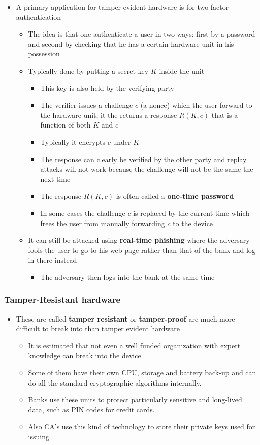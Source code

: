 \documentclass[11pt]{article}
\begin{document}
\begin{itemize}
\item A primary application for tamper-evident hardware is for two-factor authentication
\begin{itemize}
\item The idea is that one authenticate a user in two ways: first by a password and second by checking that he has a certain hardware unit in his possession
\item Typically done by putting a secret key \(K\) inside the unit
\begin{itemize}
\item This key is also held by the verifying party
\item The verifier issues a challenge \(c\) (a nonce) which the user forward to the hardware unit, it the returns a response \(R(K,c)\) that is a function of both \(K\) and \(c\)
\item Typically it encrypts \(c\) under \(K\)
\item The response can clearly be verified by the other party and replay attacks will not work because the challenge will not be the same the next time
\item The response \(R(K,c)\) is often called a \textbf{one-time password}
\item In some cases the challenge \(c\) is replaced by the current time which frees the user from manually forwarding \(c\) to the device
\end{itemize}
\item It can still be attacked using \textbf{real-time phishing} where the adversary fools the user to go to his web page rather than that of the bank and log in there instead
\begin{itemize}
\item The adversary then logs into the bank at the same time
\end{itemize}
\end{itemize}
\end{itemize}

\subsubsection{Tamper-Resistant hardware}
\label{sec:org7e6e7c4}
\begin{itemize}
\item These are called \textbf{tamper resistant} or \textbf{tamper-proof} are much more difficult to break into than tamper evident hardware
\begin{itemize}
\item It is estimated that not even a well funded organization with expert knowledge can break into the device
\item Some of them have their own CPU, storage and battery back-up and can do all the standard cryptographic algorithms internally.
\item Banks use these units to protect particularly sensitive and long-lived data, such as PIN codes for credit cards.
\item Also CA’s use this kind of technology to store their private keys used for issuing
\end{itemize}
\end{itemize}
\end{document}
